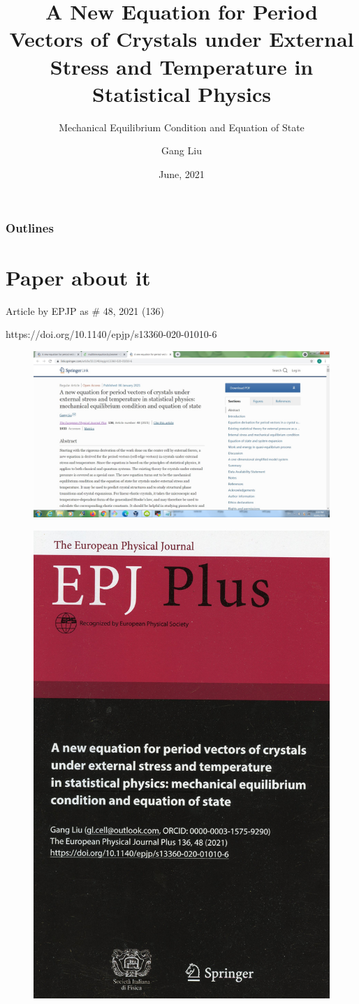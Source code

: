 \documentclass[8pt]{beamer}
\title{A New Equation for Period Vectors of Crystals under External Stress and Temperature in Statistical Physics}
\subtitle{ {\color{yellow} Mechanical Equilibrium Condition and Equation of State}}
\author{Gang Liu}
\institute
{ gl.cell@outlook.com \\
https://github.com/LiuGangKingston \\
http://www.linkedin.com/in/liuganglinkedin \\
https://doi.org/10.1140/epjp/s13360-020-01010-6 \\
Independent Researcher, Kingston, Ontario, Canada
}
\date {June, 2021}
\begin{document}
\frame{\titlepage}

\begin{frame}
\frametitle{Outlines}
\tableofcontents
\end{frame}




\section{Paper about it}

\begin{frame}{Article by EPJP as \# 48, 2021 (136)}

{\centering \vspace{.2cm} {https://doi.org/10.1140/epjp/s13360-020-01010-6} }

\pause 
\begin{figure} 
      \includegraphics[width=1.\textwidth]{./w05.jpg}
\end{figure} 
       
\pause 
\vspace{-8.15cm} 
\begin{figure} \hspace{9.5cm}
      \includegraphics[width=.31\textwidth]{./img264.jpg}
\end{figure}

\end{frame}
\end{document}
